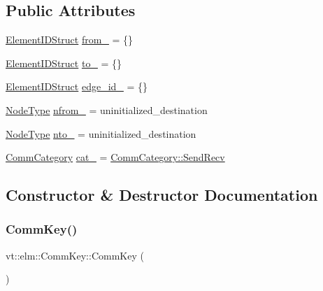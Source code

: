 \subsection*{Public Attributes}
\begin{DoxyCompactItemize}
\item 
\hyperlink{structvt_1_1elm_1_1_element_i_d_struct}{Element\+I\+D\+Struct} \hyperlink{structvt_1_1elm_1_1_comm_key_a550e5ff8b28436a977e8bf704afa7427}{from\+\_\+} = \{\}
\item 
\hyperlink{structvt_1_1elm_1_1_element_i_d_struct}{Element\+I\+D\+Struct} \hyperlink{structvt_1_1elm_1_1_comm_key_ac7387154a0eef34bf4af0c4c5a42c38f}{to\+\_\+} = \{\}
\item 
\hyperlink{structvt_1_1elm_1_1_element_i_d_struct}{Element\+I\+D\+Struct} \hyperlink{structvt_1_1elm_1_1_comm_key_a05f9fc628259a6d899b8948228190723}{edge\+\_\+id\+\_\+} = \{\}
\item 
\hyperlink{namespacevt_a866da9d0efc19c0a1ce79e9e492f47e2}{Node\+Type} \hyperlink{structvt_1_1elm_1_1_comm_key_a8d37a724bb947b07e514320ff5f3c3b6}{nfrom\+\_\+} = uninitialized\+\_\+destination
\item 
\hyperlink{namespacevt_a866da9d0efc19c0a1ce79e9e492f47e2}{Node\+Type} \hyperlink{structvt_1_1elm_1_1_comm_key_a30bf939bc0ba2ad6e9985d99fe478665}{nto\+\_\+} = uninitialized\+\_\+destination
\item 
\hyperlink{namespacevt_1_1elm_ab7367fdbe88bdcf329563642147f9ae2}{Comm\+Category} \hyperlink{structvt_1_1elm_1_1_comm_key_a96646f0648cd255cf4cdc37bcc3597ac}{cat\+\_\+} = \hyperlink{namespacevt_1_1elm_ab7367fdbe88bdcf329563642147f9ae2a95aeb71ffd419cc14c6929f9dcd6cdff}{Comm\+Category\+::\+Send\+Recv}
\end{DoxyCompactItemize}


\subsection{Constructor \& Destructor Documentation}
\mbox{\label{structvt_1_1elm_1_1_comm_key_ab6e9e495a97be72463739214749e07fb}} 
\subsubsection{\texorpdfstring{Comm\+Key()}{CommKey()}\hspace{0.1cm}{\footnotesize\ttfamily [1/7]}}
{\footnotesize\ttfamily vt\+::elm\+::\+Comm\+Key\+::\+Comm\+Key (\begin{DoxyParamCaption}{ }\end{DoxyParamCaption})\hspace{0.3cm}{\ttfamily [default]}}

